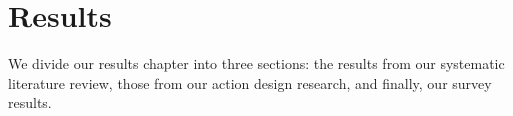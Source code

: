 \chapter{Results}\label{chapter:Results}
We divide our results chapter into three sections: the results from our systematic literature review, those from our action design research, and finally, our survey results.


\newpage

\newpage

